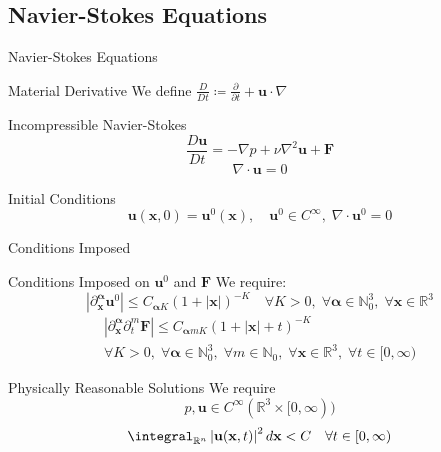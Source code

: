 \documentclass{beamer}
\newcommand{\Real}{\mathbb{R}}
\newcommand{\Natural}{\mathbb{N}}
\begin{document}
  \subsection{Navier-Stokes Equations}
  \begin{frame}{Navier-Stokes Equations}
      \pause
      \begin{block}{Material Derivative}
          We define $\frac{D}{Dt} \coloneqq \frac{\partial}{\partial t} +
          \mathbf{u} \cdot \nabla$
      \end{block}
      \pause
      \begin{block}{Incompressible Navier-Stokes}
          $$
          \frac{D \mathbf{u}}{D t} = -\nabla p + \nu\nabla^2\mathbf{u} +
          \mathbf{F}
          $$\pause
          $$
          \nabla \cdot \mathbf{u} = 0
          $$
      \end{block}
      \pause
      \begin{block}{Initial Conditions}
          $$
          \mathbf{u}(\mathbf{x}, 0) = \mathbf{u}^0(\mathbf{x}), \quad
          \mathbf{u}^0 \in C^{\infty},\; \nabla \cdot \mathbf{u}^0 = 0
          $$
      \end{block}
  \end{frame}
  \begin{frame}{Conditions Imposed}
      \linespread{0.8}
      \pause
      \begin{block}{Conditions Imposed on $\mathbf{u}^0$ and $\mathbf{F}$}
          We require:
          $$
          \left| \partial^{\boldsymbol{\alpha}}_{\mathbf{x}} \mathbf{u}^0
          \right| \le
          C_{\boldsymbol{\alpha}K} \left(1 + \left|\mathbf{x}\right|\right)^{-K} \quad
          \forall K > 0, \; \forall \boldsymbol{\alpha} \in \Natural_0^3, \;
          \forall \mathbf{x} \in \Real^3
          $$\pause
          \begin{multline*}
          \left| \partial^{\boldsymbol{\alpha}}_{\mathbf{x}}
          \partial^m_t \mathbf{F}
          \right| \le
          C_{\boldsymbol{\alpha}mK} \left(1 + \left|\mathbf{x}\right| +
          t\right)^{-K} \\
          \forall K > 0, \; \forall \boldsymbol{\alpha} \in \Natural_0^3, \;
          \forall m \in \Natural_0, \; \forall \mathbf{x} \in \Real^3, \;
          \forall t \in [0, \infty)
          \end{multline*}
      \end{block}
      \pause
      \begin{block}{Physically Reasonable Solutions}
          We require
          $$
          p, \mathbf{u} \in C^{\infty}(\Real^3 \times [0, \infty))
          $$
          \pause
          $$
          \integral_{\Real^n} \left| \mathbf{u}(\mathbf{x}, t) \right|^2
          d\mathbf{x} < C \quad \forall t \in [0, \infty)
          $$
      \end{block}
  \end{frame}
\end{document}
